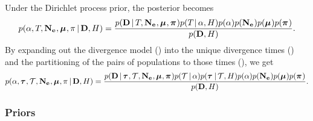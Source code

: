 \begin{linenomath}
Under the Dirichlet process prior, the posterior becomes
\begin{equation}
    p(
    \alpha,
    T_{},
    \mathbf{N_{e}}_{},
    \boldsymbol{\mu}_{},
    \pi_{}
    \,|\,
    \mathbf{D},
    H
    )
    =
    \frac{
        p(
        \mathbf{D}
        \,|\,
        T_{},
        \mathbf{N_{e}}_{},
        \boldsymbol{\mu}_{},
        \boldsymbol{\pi}_{}
        )
        p(T_{} \,|\, \alpha, H)
        p(\alpha)
        p(\mathbf{N_{e}}_{})
        p(\boldsymbol{\mu}_{})
        p(\boldsymbol{\pi}_{})
    }{
        p(
        \mathbf{D},
        H
        )
    }.
    \label{eq:bayesrule}
\end{equation}
By expanding out the divergence model (\divtimemodel) into the unique
divergence times (\divtimes) and the partitioning of the pairs of populations
to those times (\divtimesets), we get
\begin{equation}
    p(
    \alpha,
    \boldsymbol{\tau}_{},
    \mathcal{T},
    \mathbf{N_{e}}_{},
    \boldsymbol{\mu}_{},
    \pi_{}
    \,|\,
    \mathbf{D},
    H
    )
    =
    \frac{
        p(
        \mathbf{D}
        \,|\,
        \boldsymbol{\tau}_{},
        \mathcal{T},
        \mathbf{N_{e}}_{},
        \boldsymbol{\mu}_{},
        \boldsymbol{\pi}_{}
        )
        p(\mathcal{T} \,|\, \alpha)
        p(\boldsymbol{\tau}_{} \,|\, \mathcal{T}, H)
        p(\alpha)
        p(\mathbf{N_{e}}_{})
        p(\boldsymbol{\mu}_{})
        p(\boldsymbol{\pi}_{})
    }{
        p(
        \mathbf{D},
        H
        )
    }.
    \label{eq:bayesruleexpanded}
\end{equation}
\end{linenomath}

\subsubsection{Priors}


